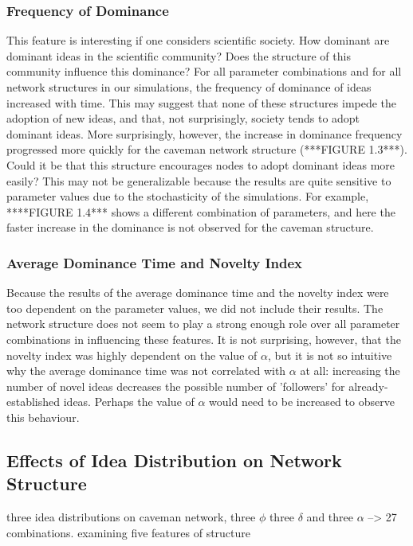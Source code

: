 \subsubsection{Frequency of Dominance}

This feature is interesting if one considers scientific society. How dominant are dominant ideas in the scientific community? Does the structure of this community influence this dominance? For all parameter combinations and for all network structures in our simulations, the frequency of dominance of ideas increased with time. This may suggest that none of these structures impede the adoption of new ideas, and that, not surprisingly, society tends to adopt dominant ideas. More surprisingly, however, the increase in dominance frequency progressed more quickly for the caveman network structure (***FIGURE 1.3***). Could it be that this structure encourages nodes to adopt dominant ideas more easily? This may not be generalizable because the results are quite sensitive to parameter values due to the stochasticity of the simulations. For example, ****FIGURE 1.4*** shows a different combination of parameters, and here the faster increase in the dominance is not observed for the caveman structure.


\subsubsection{Average Dominance Time and Novelty Index}


Because the results of the average dominance time and the novelty index were too dependent on the parameter values, we did not include their results. The network structure does not seem to play a strong enough role over all parameter combinations in influencing these features. It is not surprising, however, that the novelty index was highly dependent on the value of $\alpha$, but it is not so intuitive why the average dominance time was not correlated with $\alpha$ at all: increasing the number of novel ideas decreases the possible number of 'followers' for already-established ideas. Perhaps the value of $\alpha$ would need to be increased to observe this behaviour.



\subsection{Effects of Idea Distribution on Network Structure}

three idea distributions on caveman network, three $\phi$ three $\delta$ and three $\alpha$ --> 27 combinations. examining five features of structure



